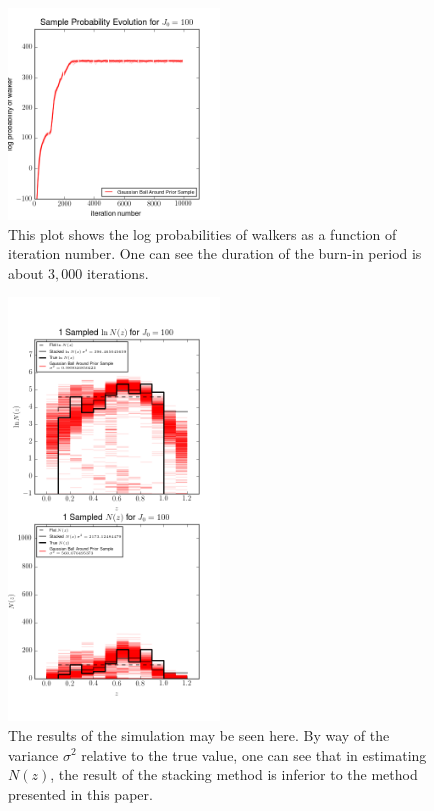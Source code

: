\documentclass[preprint]{aastex}
\begin{document}
\begin{figure}
\includegraphics[width=0.5\textwidth]{real/probs.png}
\caption{This plot shows the log probabilities of walkers as a function of iteration number.  One can see the duration of the burn-in period is about $3,000$ iterations.}
\label{fig:realprob}
\end{figure}

\begin{figure}
\includegraphics[width=0.5\textwidth]{real/samps.png}
\caption{The results of the simulation may be seen here.  By way of the variance $\sigma^{2}$ relative to the true value, one can see that in estimating $N(z)$, the result of the stacking method is inferior to the method presented in this paper.}
\label{fig:realparam}
\end{figure}
\end{document}
